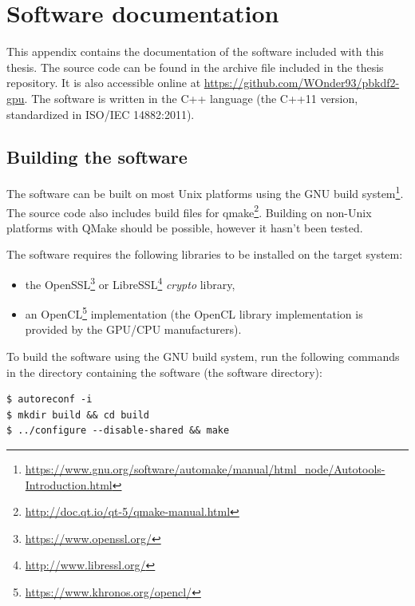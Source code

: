 \documentclass[12pt,oneside]{fithesis2}
\begin{document}
    \appendix
    \chapter{Software documentation} \label{a:docs}
      This appendix contains the documentation of the software included with this thesis. The source code can be found in the archive file included in the thesis repository. It is also accessible online at \url{https://github.com/WOnder93/pbkdf2-gpu}. The software is written in the C++ language (the C++11 version, standardized in ISO/IEC 14882:2011).
      
      \section{Building the software} \label{s:building}
      The software can be built on most Unix platforms using the GNU build system\footnote{\url{https://www.gnu.org/software/automake/manual/html_node/Autotools-Introduction.html}}. The source code also includes build files for qmake\footnote{\url{http://doc.qt.io/qt-5/qmake-manual.html}}. Building on non-Unix platforms with QMake should be possible, however it hasn't been tested.
      
      The software requires the following libraries to be installed on the target system:
      \begin{itemize}
        \item the OpenSSL\footnote{\url{https://www.openssl.org/}} or LibreSSL\footnote{\url{http://www.libressl.org/}} \emph{crypto} library,
        \item an OpenCL\footnote{\url{https://www.khronos.org/opencl/}} implementation (the OpenCL library implementation is provided by the GPU/CPU manufacturers).
      \end{itemize}
      
      To build the software using the GNU build system, run the following commands in the directory containing the software (the software directory):
      
      \begin{verbatim}
$ autoreconf -i
$ mkdir build && cd build
$ ../configure --disable-shared && make
      \end{verbatim}
      
\end{document}
